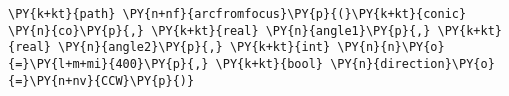 \begin{Verbatim}[commandchars=\\\{\}]
      \PY{k+kt}{path} \PY{n+nf}{arcfromfocus}\PY{p}{(}\PY{k+kt}{conic} \PY{n}{co}\PY{p}{,} \PY{k+kt}{real} \PY{n}{angle1}\PY{p}{,} \PY{k+kt}{real} \PY{n}{angle2}\PY{p}{,} \PY{k+kt}{int} \PY{n}{n}\PY{o}{=}\PY{l+m+mi}{400}\PY{p}{,} \PY{k+kt}{bool} \PY{n}{direction}\PY{o}{=}\PY{n+nv}{CCW}\PY{p}{)}
\end{Verbatim}
